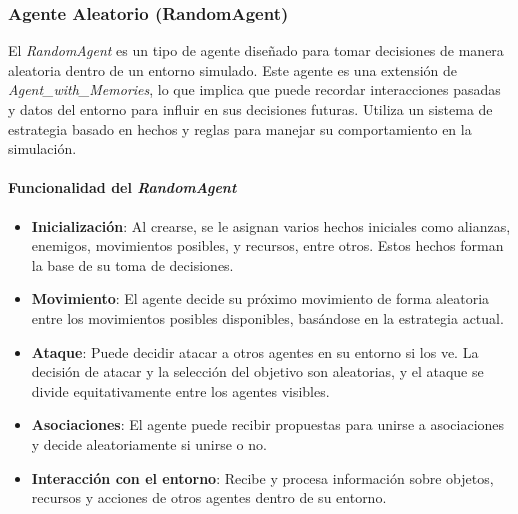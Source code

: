 \documentclass[11pt]{article}
\begin{document}
\subsubsection{Agente Aleatorio (RandomAgent)}
El \textit{RandomAgent} es un tipo de agente diseñado para tomar decisiones de manera aleatoria dentro de un entorno simulado. Este agente es una extensión de \textit{Agent\_with\_Memories}, lo que implica que puede recordar interacciones pasadas y datos del entorno para influir en sus decisiones futuras. Utiliza un sistema de estrategia basado en hechos y reglas para manejar su comportamiento en la simulación.

\paragraph{Funcionalidad del \textit{RandomAgent}}
\begin{itemize}
    \item \textbf{Inicialización}: Al crearse, se le asignan varios hechos iniciales como alianzas, enemigos, movimientos posibles, y recursos, entre otros. Estos hechos forman la base de su toma de decisiones.
    \item \textbf{Movimiento}: El agente decide su próximo movimiento de forma aleatoria entre los movimientos posibles disponibles, basándose en la estrategia actual.
    \item \textbf{Ataque}: Puede decidir atacar a otros agentes en su entorno si los ve. La decisión de atacar y la selección del objetivo son aleatorias, y el ataque se divide equitativamente entre los agentes visibles.
    \item \textbf{Asociaciones}: El agente puede recibir propuestas para unirse a asociaciones y decide aleatoriamente si unirse o no.
    \item \textbf{Interacción con el entorno}: Recibe y procesa información sobre objetos, recursos y acciones de otros agentes dentro de su entorno.
\end{itemize}
\end{document}
